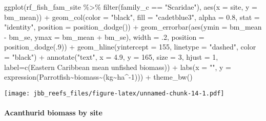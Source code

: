 \documentclass[
]{article}
\newenvironment{Shaded}{\begin{snugshade}}{\end{snugshade}}
\newcommand{\AttributeTok}[1]{\textcolor[rgb]{0.77,0.63,0.00}{#1}}
\newcommand{\DecValTok}[1]{\textcolor[rgb]{0.00,0.00,0.81}{#1}}
\newcommand{\FloatTok}[1]{\textcolor[rgb]{0.00,0.00,0.81}{#1}}
\newcommand{\FunctionTok}[1]{\textcolor[rgb]{0.00,0.00,0.00}{#1}}
\newcommand{\NormalTok}[1]{#1}
\newcommand{\SpecialCharTok}[1]{\textcolor[rgb]{0.00,0.00,0.00}{#1}}
\newcommand{\StringTok}[1]{\textcolor[rgb]{0.31,0.60,0.02}{#1}}
\begin{document}
\begin{Shaded}
\begin{Highlighting}[]
\FunctionTok{ggplot}\NormalTok{(rf\_fish\_fam\_site }\SpecialCharTok{\%\textgreater{}\%}
        \FunctionTok{filter}\NormalTok{(family\_c }\SpecialCharTok{==} \StringTok{"Scaridae"}\NormalTok{),}
       \FunctionTok{aes}\NormalTok{(}\AttributeTok{x =}\NormalTok{ site, }\AttributeTok{y =}\NormalTok{ bm\_mean)) }\SpecialCharTok{+}
  \FunctionTok{geom\_col}\NormalTok{(}\AttributeTok{color =} \StringTok{"black"}\NormalTok{, }\AttributeTok{fill =} \StringTok{"cadetblue3"}\NormalTok{, }\AttributeTok{alpha =} \FloatTok{0.8}\NormalTok{, }\AttributeTok{stat =} \StringTok{"identity"}\NormalTok{, }\AttributeTok{position =} \FunctionTok{position\_dodge}\NormalTok{()) }\SpecialCharTok{+}
  \FunctionTok{geom\_errorbar}\NormalTok{(}\FunctionTok{aes}\NormalTok{(}\AttributeTok{ymin =}\NormalTok{ bm\_mean }\SpecialCharTok{{-}}\NormalTok{ bm\_se, }\AttributeTok{ymax =}\NormalTok{ bm\_mean }\SpecialCharTok{+}\NormalTok{ bm\_se), }\AttributeTok{width =}\NormalTok{ .}\DecValTok{2}\NormalTok{,}
                 \AttributeTok{position =} \FunctionTok{position\_dodge}\NormalTok{(.}\DecValTok{9}\NormalTok{)) }\SpecialCharTok{+}
  \FunctionTok{geom\_hline}\NormalTok{(}\AttributeTok{yintercept =} \DecValTok{155}\NormalTok{, }\AttributeTok{linetype =} \StringTok{"dashed"}\NormalTok{, }\AttributeTok{color =} \StringTok{"black"}\NormalTok{) }\SpecialCharTok{+}
  \FunctionTok{annotate}\NormalTok{(}\StringTok{"text"}\NormalTok{, }\AttributeTok{x =} \FloatTok{4.9}\NormalTok{, }\AttributeTok{y =} \DecValTok{165}\NormalTok{, }\AttributeTok{size =} \DecValTok{3}\NormalTok{, }\AttributeTok{hjust =} \DecValTok{1}\NormalTok{, }\AttributeTok{label=}\FunctionTok{c}\NormalTok{(}\StringTok{\textquotesingle{}Eastern Caribbean mean unfished biomass\textquotesingle{}}\NormalTok{)) }\SpecialCharTok{+}
  \FunctionTok{labs}\NormalTok{(}\AttributeTok{x =} \StringTok{""}\NormalTok{, }\AttributeTok{y =} \FunctionTok{expression}\NormalTok{(Parrotfish}\SpecialCharTok{\textasciitilde{}}\NormalTok{biomass}\SpecialCharTok{\textasciitilde{}}\NormalTok{(kg}\SpecialCharTok{\textasciitilde{}}\NormalTok{ha}\SpecialCharTok{\^{}{-}}\DecValTok{1}\NormalTok{))) }\SpecialCharTok{+}
  \FunctionTok{theme\_bw}\NormalTok{()}
\end{Highlighting}
\end{Shaded}

\texttt{[image: jbb\_reefs\_files/figure-latex/unnamed-chunk-14-1.pdf]}

\hypertarget{acanthurid-biomass-by-site}{%
\paragraph{Acanthurid biomass by
site}\label{acanthurid-biomass-by-site}}
\end{document}
